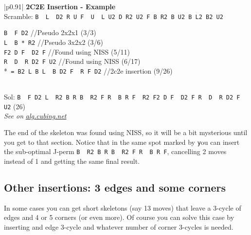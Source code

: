 \documentclass[11pt,a4paper]{book}
\newcommand{\p}{\textquotesingle}
\newcommand{\m}{\texttt}
\newcommand{\ps}{\p\,\,}
\newcommand{\comment}[1]{{\color{gray}\quad//#1}}
\begin{document}
\bigskip
\begin{tabular}{|p{}|}
\hline
\textbf{2C2E Insertion - Example}\\
\hline
Scramble: \m{B\ps L\ps D2 R U F\ps U\ps L U2 D R2 U2 F B R2 B U2 B L2 B2 U2}\\
\hline
\begin{minipage}[l]{0.650\textwidth}
\m{B\ps F D2} \comment{Pseudo 2x2x1 (3/3)}\\
\m{L\ps B * R2} \comment{Pseudo 3x2x2 (3/6)}\\
\m{F2 D F\ps D2 F} \comment{Found using NISS (5/11)}\\
\m{R\ps D\ps R D2 F U2} \comment{Found using NISS (6/17)}\\
*\m{ = B2 L B L\ps B D2 F\ps R F D2} \comment{2c2e insertion (9/26)}
\end{minipage}
\begin{minipage}[c]{0.25\textwidth}

\end{minipage}\\
\hline
Sol: \m{B\ps F D2 L\ps R2 B R B\ps R2 F R\ps B R F\ps R2 F2 D F\ps D2 F R\ps D\ps R D2 F U2} (26)\\
\hline
\emph{See on }\href{https://alg.cubing.net/?setup=B-_L-_D2_R_U_F-_U-_L_U2_D_R2_U2_F_B_R2_B_U2_B_L2_B2_U2&alg=B-_F_D2_\%2F\%2FPseudo_2x2x1_(3\%2F3)\%0AL-_B_(B2_L_B_L-_B_D2_F-_R_F_D2)_R2_\%2F\%2FPseudo_3x2x2_(3\%2F6)\%0AF2_D_F-_D2_F_\%2F\%2FFound_using_NISS_(5\%2F11)\%0AR-_D-_R_D2_F_U2_\%2F\%2FFound_using_NISS_(6\%2F17)}{\emph{alg.cubing.net}}\\
\hline
\end{tabular}
\bigskip

The end of the skeleton was found using NISS, so it will be a bit mysterious until you get to that section. Notice that in the same spot marked by \m * you can insert the sub-optimal J-perm \m{B\ps R2 B R B\ps R2 F R\ps B R F\p}, cancelling 2 moves instead of 1 and getting the same final result.

\subsection{Other insertions: 3 edges and some corners}
\label{3enc}

In some cases you can get short skeletons (say 13 moves) that leave a 3-cycle of edges and 4 or 5 corners (or even more). Of course you can solve this case by inserting and edge 3-cycle and whatever number of corner 3-cycles is needed.
\end{document}
